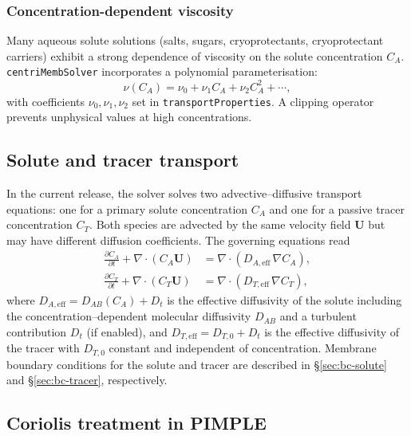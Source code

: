 \documentclass[11pt,a4paper]{article}
\begin{document}
\subsubsection{Concentration-dependent viscosity}

Many aqueous solute solutions (salts, sugars, cryoprotectants,
cryoprotectant carriers) exhibit a strong dependence of viscosity on
the solute concentration \(C_A\).  \texttt{centriMembSolver}
incorporates a polynomial parameterisation:
\begin{equation}
	\nu(C_A) = \nu_0 + \nu_1 C_A + \nu_2 C_A^2 + \cdots,
\end{equation}
with coefficients \(\nu_0,\nu_1,\nu_2\) set in
\texttt{transportProperties}.  A clipping operator prevents unphysical
values at high concentrations.



\subsection{Solute and tracer transport}

In the current release, the solver solves two advective–diffusive transport equations: one for a primary solute concentration \(C_A\) and one for a passive tracer concentration \(C_T\). Both species are advected by the same velocity field \(\mathbf{U}\) but may have different diffusion coefficients.  The governing equations read
\begin{align}
  \frac{\partial C_A}{\partial t} + \nabla\cdot(C_A\mathbf{U}) &= \nabla\cdot(D_{A,\mathrm{eff}}\,\nabla C_A),\\[0.5ex]
  \frac{\partial C_T}{\partial t} + \nabla\cdot(C_T\mathbf{U}) &= \nabla\cdot(D_{T,\mathrm{eff}}\,\nabla C_T),
\end{align}
where \(D_{A,\mathrm{eff}} = D_{AB}(C_A) + D_t\) is the effective diffusivity of the solute including the concentration–dependent molecular diffusivity \(D_{AB}\) and a turbulent contribution \(D_t\) (if enabled), and \(D_{T,\mathrm{eff}} = D_{T,0} + D_t\) is the effective diffusivity of the tracer with \(D_{T,0}\) constant and independent of concentration. Membrane boundary conditions for the solute and tracer are described in \S\ref{sec:bc-solute} and \S\ref{sec:bc-tracer}, respectively.

\subsection{Coriolis treatment in PIMPLE}
\label{sec:coriolis}
\end{document}
